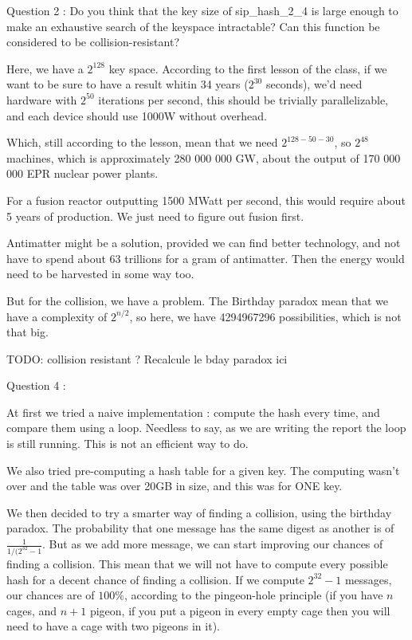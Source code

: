 \documentclass[4apaper]{report}
\begin{document}
Question 2 : Do you think that the key size of sip\_hash\_2\_4 is large enough to make an exhaustive search of the keyspace intractable? Can this function be considered to be collision-resistant?

Here, we have a $2^{128}$ key space. According to the first lesson of the class, if we want to be sure to have a result whitin 34 years ($2^{30}$ seconds), we'd need hardware with $2^{50}$ iterations per second, this should be trivially parallelizable, and each device should use 1000W without overhead.

Which, still according to the lesson, mean that we need $2^{128-50-30}$, so $2^{48}$ machines, which is approximately 280 000 000 GW, about the output of 170 000 000 EPR nuclear power plants.

For a fusion reactor outputting 1500 MWatt per second, this would require about 5 years of production. We just need to figure out fusion first.

Antimatter might be a solution, provided we can find better technology, and not have to spend about 63 trillions for a gram of antimatter. Then the energy would need to be harvested in some way too.

But for the collision, we have a problem. The Birthday paradox mean that we have a complexity of $2^{n/2}$, so here, we have 4294967296 possibilities, which is not that big.

TODO: collision resistant ? Recalcule le bday paradox ici

Question 4 :

At first we tried a naive implementation : compute the hash every time, and compare them using a loop. Needless to say, as we are writing the report the loop is still running. This is not an efficient way to do.

We also tried pre-computing a hash table for a given key. The computing wasn't over and the table was over 20GB in size, and this was for ONE key.

We then decided to try a smarter way of finding a collision, using the birthday paradox. The probability that one message has the same digest as another is of $\frac{1}{1/(2^{32} - 1}$. But as we add more message, we can start improving our chances of finding a collision. This mean that we will not have to compute every possible hash for a decent chance of finding a collision. If we compute $2^32-1$ messages, our chances are of $100\%$, according to the pingeon-hole principle (if you have $n$ cages, and $n+1$ pigeon, if you put a pigeon in every empty cage then you will need to have a cage with two pigeons in it).
\end{document}
